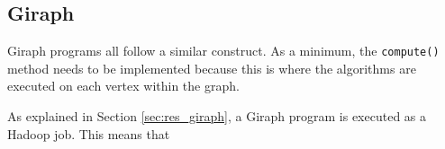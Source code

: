 \subsection{Giraph}
Giraph programs all follow a similar construct. As a minimum, the \verb/compute()/ method needs to be implemented because this is where the algorithms are executed on each vertex within the graph.

As explained in Section \ref{sec:res_giraph}, a Giraph program is executed as a Hadoop job. This means that 